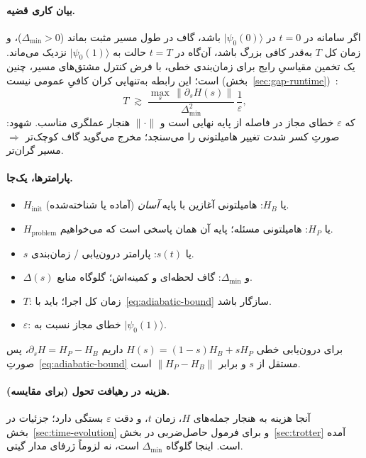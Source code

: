 \paragraph{بیان کاری قضیه.}
اگر سامانه در $t=0$ در $\lvert\psi_0(0)\rangle$ باشد، گاف در طول مسیر مثبت بماند ($\Delta_{\min}>0$)، و زمان کل $T$ به‌قدر کافی بزرگ باشد، آن‌گاه در $t=T$ حالت به $\lvert\psi_0(1)\rangle$ نزدیک می‌ماند. یک تخمین مقیاسیِ رایج برای زمان‌بندی خطی، با فرض کنترل مشتق‌های مسیر، چنین است؛ این رابطه به‌تنهایی کران کافیِ عمومی نیست (بخش~\ref{sec:gap-runtime})~\cite{AlbashLidar2018}:
\begin{equation}
	\label{eq:adiabatic-bound}
	T \;\gtrsim\; \frac{\displaystyle\max_{s}\,\bigl\lVert\partial_s H(s)\bigr\rVert}{\Delta_{\min}^{2}}\,\frac{1}{\varepsilon},
\end{equation}
که $\varepsilon$ خطای مجاز در فاصله از پایه نهایی است و $\lVert\cdot\rVert$ هنجار عملگری مناسب. شهود: صورتِ کسر شدت تغییر هامیلتونی را می‌سنجد؛ مخرج می‌گوید گاف کوچک‌تر $\Rightarrow$ مسیر گران‌تر.

\paragraph{پارامترها، یک‌جا.}
\begin{itemize}
	\item $H_{\mathrm{init}}$ یا $H_B$: هامیلتونی آغازین با پایه \emph{آسان} (آماده یا شناخته‌شده).
	\item $H_{\mathrm{problem}}$ یا $H_P$: هامیلتونی مسئله؛ پایه آن همان پاسخی است که می‌خواهیم.
	\item $s$ یا $s(t)$: پارامتر درون‌یابی / زمان‌بندی.
	\item $\Delta(s)$ و $\Delta_{\min}$: گاف لحظه‌ای و کمینه‌اش؛ گلوگاه منابع.
	\item $T$: زمان کل اجرا؛ باید با~\eqref{eq:adiabatic-bound} سازگار باشد.
	\item $\varepsilon$: خطای مجاز نسبت به $\lvert\psi_0(1)\rangle$.
\end{itemize}
برای درون‌یابی خطی $H(s)=(1-s)H_B+s H_P$ داریم $\partial_s H = H_P-H_B$، پس صورتِ~\eqref{eq:adiabatic-bound} مستقل از $s$ و برابر $\lVert H_P-H_B\rVert$ است.

\paragraph{هزینه در رهیافت تحول (برای مقایسه).}
آنجا هزینه به هنجار جمله‌های $H$، زمان $t$، و دقت $\varepsilon$ بستگی دارد؛ جزئیات در بخش~\ref{sec:time-evolution} و برای فرمول حاصل‌ضربی در بخش~\ref{sec:trotter} آمده است. اینجا گلوگاه $\Delta_{\min}$ است، نه لزوماً ژرفای مدار گیتی.

